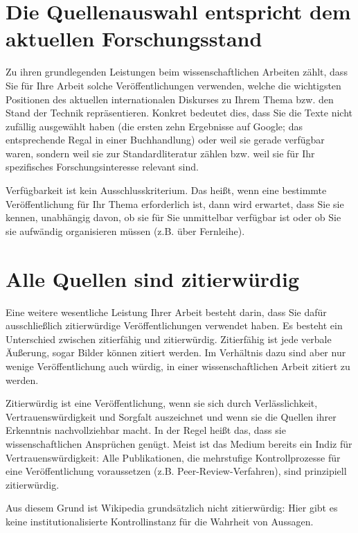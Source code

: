 \section{Die Quellenauswahl entspricht dem aktuellen Forschungsstand}
\label{sec:quellenauswahl-forschungsstand}

Zu ihren grundlegenden Leistungen beim wissenschaftlichen Arbeiten zählt, dass Sie für Ihre Arbeit solche Veröffentlichungen verwenden, welche die wichtigsten Positionen des aktuellen internationalen Diskurses zu Ihrem Thema bzw. den Stand der Technik repräsentieren. Konkret bedeutet dies, dass Sie die Texte nicht zufällig ausgewählt haben (die ersten zehn Ergebnisse auf Google; das entsprechende Regal in einer Buchhandlung) oder weil sie gerade verfügbar waren, sondern weil sie zur Standardliteratur zählen bzw. weil sie für Ihr spezifisches Forschungsinteresse relevant sind.

Verfügbarkeit ist kein Ausschlusskriterium. Das heißt, wenn eine bestimmte Veröffentlichung für Ihr Thema erforderlich ist, dann wird erwartet, dass Sie sie kennen, unabhängig davon, ob sie für Sie unmittelbar verfügbar ist oder ob Sie sie aufwändig organisieren müssen (z.B. über Fernleihe).

\section{Alle Quellen sind zitierwürdig}
\label{sec:quellen-zitierwuerdig}

Eine weitere wesentliche Leistung Ihrer Arbeit besteht darin, dass Sie dafür ausschließlich zitierwürdige Veröffentlichungen verwendet haben. Es besteht ein Unterschied zwischen zitierfähig und zitierwürdig. Zitierfähig ist jede verbale Äußerung, sogar Bilder können zitiert werden. Im Verhältnis dazu sind aber nur wenige Veröffentlichung auch würdig, in einer wissenschaftlichen Arbeit zitiert zu werden.

Zitierwürdig ist eine Veröffentlichung, wenn sie sich durch Verlässlichkeit, Vertrauenswürdigkeit und Sorgfalt auszeichnet und wenn sie die Quellen ihrer Erkenntnis nachvollziehbar macht. In der Regel heißt das, dass sie wissenschaftlichen Ansprüchen genügt. Meist ist das Medium bereits ein Indiz für Vertrauenswürdigkeit: Alle Publikationen, die mehrstufige Kontrollprozesse für eine Veröffentlichung voraussetzen (z.B. Peer-Review-Verfahren), sind prinzipiell zitierwürdig.

Aus diesem Grund ist Wikipedia grundsätzlich nicht zitierwürdig: Hier gibt es keine institutionalisierte Kontrollinstanz für die Wahrheit von Aussagen.

